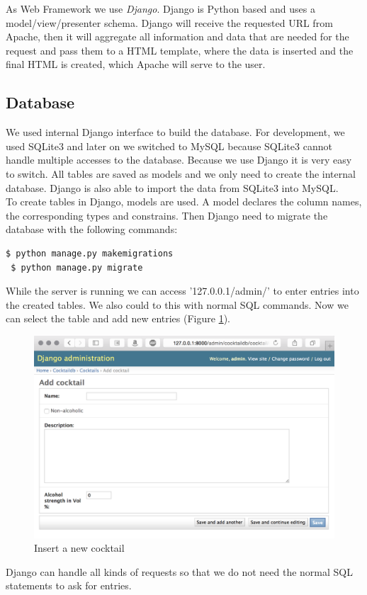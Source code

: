 \documentclass{acm_proc_article-sp}
\begin{document}
As Web Framework we use \textit{Django}. Django is Python based and uses a model/view/presenter schema. Django will receive the requested URL from Apache, then it will aggregate all information and data that are needed for the request and pass them to a HTML template, where the data is inserted and the final HTML is created, which Apache will serve to the user.



\subsection{Database}
We used internal Django interface to build the database. For development, we used SQLite3 and later on we switched to MySQL because SQLite3 cannot handle multiple accesses to the database. Because we use Django it is very easy to switch. All tables are saved as models and we only need to create the internal database. Django is also able to import the data from SQLite3 into MySQL. \\
To create tables in Django, models are used. A model declares the column names, the corresponding types and constrains. Then Django need to migrate the database with the following commands:
\begin{lstlisting}[language=bash]
 $ python manage.py makemigrations
 $ python manage.py migrate
\end{lstlisting}
While the server is running we can access '127.0.0.1/admin/' to enter entries into the created tables. We also could to this with normal SQL commands. Now we can select the table and add new entries (Figure \ref{fig:db_entry}). \\
\begin{figure}[htbp] 
 \centering
    \includegraphics[width=0.8\linewidth]{pictures/db_insert_entry.png}
 \caption{Insert a new cocktail}
 \label{fig:db_entry}
\end{figure}
Django can handle all kinds of requests so that we do not need the normal SQL statements to ask for entries.
\end{document}
